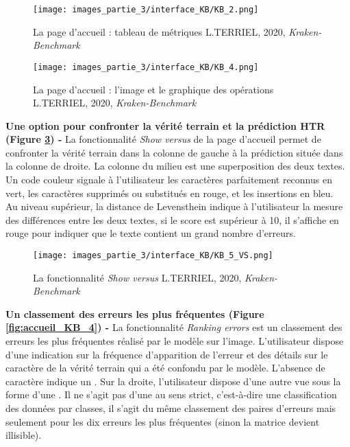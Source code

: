 \begin{figure}[h!]
    \centering
    \texttt{[image: images\_partie\_3/interface\_KB/KB\_2.png]}
        \caption{La page d'accueil : tableau de métriques \textcopyright L.TERRIEL, 2020, \textit{Kraken-Benchmark}}
        \label{fig:accueil_KB_1}
\end{figure}
\begin{figure}[h!]
    \centering
    \texttt{[image: images\_partie\_3/interface\_KB/KB\_4.png]}
        \caption{La page d'accueil : l'image et le graphique des opérations \textcopyright L.TERRIEL, 2020, \textit{Kraken-Benchmark}}
        \label{fig:accueil_KB_2}
\end{figure}
\newpage
\textbf{Une option pour confronter la vérité terrain et la prédiction HTR (Figure \ref{fig:accueil_KB_3}) - } La fonctionnalité \textit{Show versus} de la page d'accueil permet de confronter la vérité terrain dans la colonne de gauche à la prédiction située dans la colonne de droite. La colonne du milieu est une superposition des deux textes. Un code couleur signale à l'utilisateur les caractères parfaitement reconnus en vert, les caractères supprimés ou substitués en rouge, et les insertions en bleu. \\ Au niveau supérieur, la distance de Levensthein indique à l'utilisateur la mesure des différences entre les deux textes, si le score est supérieur à 10, il s'affiche en rouge pour indiquer que le texte contient un grand nombre d'erreurs.
\begin{figure}[h!]
    \centering
    \texttt{[image: images\_partie\_3/interface\_KB/KB\_5\_VS.png]}
        \caption{La fonctionnalité \textit{Show versus} \textcopyright L.TERRIEL, 2020, \textit{Kraken-Benchmark}}
        \label{fig:accueil_KB_3}
\end{figure}
\bigskip

\textbf{Un classement des erreurs les plus fréquentes (Figure \ref{fig:accueil_KB_4}) - }  La fonctionnalité \textit{Ranking errors} est un classement des erreurs les plus fréquentes réalisé par le modèle sur l'image. L'utilisateur dispose d'une indication sur la fréquence d'apparition de l'erreur et des détails sur le caractère de la vérité terrain qui a été confondu par le modèle. L'absence de caractère indique un . Sur la droite, l'utilisateur dispose d'une autre vue sous la forme d'une . Il ne s'agit pas d'une  au sens strict, c'est-à-dire une classification des données par classes, il s'agit du même classement des paires d'erreurs mais seulement pour les dix erreurs les plus fréquentes (sinon la matrice devient illisible). 

